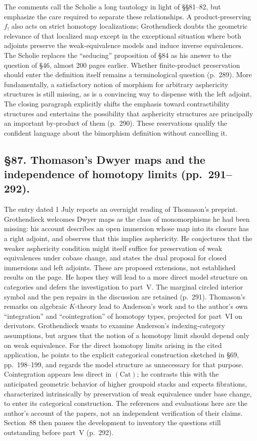 \documentclass[10pt,oneside]{book}
\begin{document}
The comments call the Scholie a long tautology in light of \S\S81--82, but emphasize the care required to separate these relationships. A product-preserving $f_!$ also acts on strict homotopy localizations; Grothendieck doubts the geometric relevance of that localized map except in the exceptional situation where both adjoints preserve the weak-equivalence models and induce inverse equivalences. The Scholie replaces the “seducing” proposition of \S84 as his answer to the question of \S46, almost 200 pages earlier. Whether finite-product preservation should enter the definition itself remains a terminological question (p.\ 289). More fundamentally, a satisfactory notion of morphism for arbitrary asphericity structures is still missing, as is a convincing way to dispense with the left adjoint. The closing paragraph explicitly shifts the emphasis toward contractibility structures and entertains the possibility that asphericity structures are principally an important by-product of them (p.\ 290). These reservations qualify the confident language about the bimorphism definition without cancelling it.

\subsection*{\S87. Thomason's Dwyer maps and the independence of homotopy limits (pp.\ 291--292).}
The entry dated 1 July reports an overnight reading of Thomason's preprint. Grothendieck welcomes Dwyer maps as the class of monomorphisms he had been missing: his account describes an open immersion whose map into its closure has a right adjoint, and observes that this implies asphericity. He conjectures that the weaker asphericity condition might itself suffice for preservation of weak equivalences under cobase change, and states the dual proposal for closed immersions and left adjoints. These are proposed extensions, not established results on the page. He hopes they will lead to a more direct model structure on categories and defers the investigation to part~V. The marginal circled interior symbol and the pen repairs in the discussion are retained (p.\ 291).
Thomason's remarks on algebraic $K$-theory lead to Anderson's work and to the author's own “integration” and “cointegration” of homotopy types, projected for part~VI on derivators. Grothendieck wants to examine Anderson's indexing-category assumptions, but argues that the notion of a homotopy limit should depend only on weak equivalence. For the direct homotopy limits arising in the cited application, he points to the explicit categorical construction sketched in \S69, pp.\ 198--199, and regards the model structure as unnecessary for that purpose. Cointegration appears less direct in $(\mathrm{Cat})$; he contrasts this with the anticipated geometric behavior of higher groupoid stacks and expects fibrations, characterized intrinsically by preservation of weak equivalence under base change, to enter its categorical construction. The references and evaluations here are the author's account of the papers, not an independent verification of their claims. Section~88 then pauses the development to inventory the questions still outstanding before part~V (p.\ 292).
\end{document}
